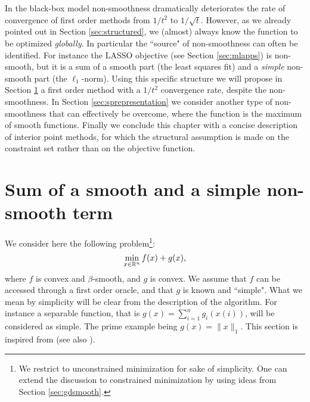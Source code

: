 In the black-box model non-smoothness dramatically deteriorates the rate of convergence of first order methods from $1/t^2$ to $1/\sqrt{t}$. However, as we already pointed out in Section \ref{sec:structured}, we (almost) always know the function to be optimized {\em globally}. In particular the ``source" of non-smoothness can often be identified. For instance the LASSO objective (see Section \ref{sec:mlapps}) is non-smooth, but it is a sum of a smooth part (the least squares fit) and a {\em simple} non-smooth part (the $\ell_1$-norm). Using this specific structure we will propose in Section \ref{sec:simplenonsmooth} a first order method with a $1/t^2$ convergence rate, despite the non-smoothness. In Section \ref{sec:sprepresentation} we consider another type of non-smoothness that can effectively be overcome, where the function is the maximum of smooth functions. Finally we conclude this chapter with a concise description of interior point methods, for which the structural assumption is made on the constraint set rather than on the objective function.

\section{Sum of a smooth and a simple non-smooth term} \label{sec:simplenonsmooth}
We consider here the following problem\footnote{We restrict to unconstrained minimization for sake of simplicity. One can extend the discussion to constrained minimization by using ideas from Section \ref{sec:gdsmooth}.}:
$$\min_{x \in \mathbb{R}^n} f(x) + g(x) ,$$
where $f$ is convex and $\beta$-smooth, and $g$ is convex. We assume that $f$ can be accessed through a first order oracle, and that $g$ is known and ``simple". What we mean by simplicity will be clear from the description of the algorithm. For instance a separable function, that is $g(x) = \sum_{i=1}^n g_i(x(i))$, will be considered as simple. The prime example being $g(x) = \|x\|_1$. This section is inspired from \cite{BT09} (see also \cite{Nes07, WNF09}).

